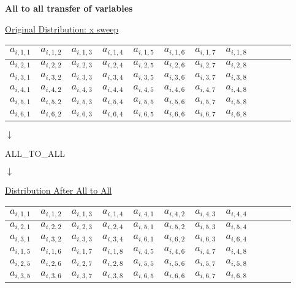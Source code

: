 \documentclass[11pt,doublespace]{article}
\begin{document}
\begin{center}
{\Large {\bf All to all transfer of variables} }
\end{center}
\bigskip

\centerline{\underline{Original Distribution: x sweep}}
\medskip
\begin{center}
\begin{tabular}{|c|c|c|c||c|c|c|c|c|c|c|c|} 
\hline
$ a_{i,1,1}$ &  $a_{i,1,2}$ & $a_{i,1,3}$ & $a_{i,1,4}$ & $a_{i,1,5}$ & $a_{i,1,6}$ & $a_{i,1,7}$ & $a_{i,1,8}$ \\
\hline
$ a_{i,2,1}$ &  $a_{i,2,2}$ & $a_{i,2,3}$ & $a_{i,2,4}$ & $a_{i,2,5}$ & $a_{i,2,6}$ & $a_{i,2,7}$ & $a_{i,2,8}$ \\
\hline
$ a_{i,3,1}$ &  $a_{i,3,2}$ & $a_{i,3,3}$ & $a_{i,3,4}$ & $a_{i,3,5}$ & $a_{i,3,6}$ & $a_{i,3,7}$ & $a_{i,3,8}$ \\
\hline\hline\hline
$ a_{i,4,1}$ &  $a_{i,4,2}$ & $a_{i,4,3}$ & $a_{i,4,4}$ & $a_{i,4,5}$ & $a_{i,4,6}$ & $a_{i,4,7}$ & $a_{i,4,8}$ \\
\hline
$ a_{i,5,1}$ &  $a_{i,5,2}$ & $a_{i,5,3}$ & $a_{i,5,4}$ & $a_{i,5,5}$ & $a_{i,5,6}$ & $a_{i,5,7}$ & $a_{i,5,8}$ \\
\hline
$ a_{i,6,1}$ &  $a_{i,6,2}$ & $a_{i,6,3}$ & $a_{i,6,4}$ & $a_{i,6,5}$ & $a_{i,6,6}$ & $a_{i,6,7}$ & $a_{i,6,8}$ \\
\hline
\end{tabular}
\end{center}

\begin{center}
$\downarrow$
\end{center}

\begin{center}
{\Large ALL\_TO\_ALL }
\end{center}

\begin{center}
$\downarrow$
\end{center}

\centerline{\underline{Distribution After All to All}}
\medskip
\begin{center}
\begin{tabular}{|c|c|c|c||c|c|c|c|c|c|c|c|} 
\hline
$ a_{i,1,1}$ &  $a_{i,1,2}$ & $a_{i,1,3}$ & $a_{i,1,4}$ & $ a_{i,4,1}$ &  $a_{i,4,2}$ & $a_{i,4,3}$ & $a_{i,4,4}$ \\
\hline
$ a_{i,2,1}$ &  $a_{i,2,2}$ & $a_{i,2,3}$ & $a_{i,2,4}$ & $ a_{i,5,1}$ &  $a_{i,5,2}$ & $a_{i,5,3}$ & $a_{i,5,4}$ \\
\hline
$ a_{i,3,1}$ &  $a_{i,3,2}$ & $a_{i,3,3}$ & $a_{i,3,4}$ & $ a_{i,6,1}$ &  $a_{i,6,2}$ & $a_{i,6,3}$ & $a_{i,6,4}$ \\
\hline\hline\hline
$a_{i,1,5}$ & $a_{i,1,6}$ & $a_{i,1,7}$ & $a_{i,1,8}$ & $a_{i,4,5}$ & $a_{i,4,6}$ & $a_{i,4,7}$ & $a_{i,4,8}$ \\
\hline
$a_{i,2,5}$ & $a_{i,2,6}$ & $a_{i,2,7}$ & $a_{i,2,8}$ & $a_{i,5,5}$ & $a_{i,5,6}$ & $a_{i,5,7}$ & $a_{i,5,8}$ \\
\hline
$a_{i,3,5}$ & $a_{i,3,6}$ & $a_{i,3,7}$ & $a_{i,3,8}$ & $a_{i,6,5}$ & $a_{i,6,6}$ & $a_{i,6,7}$ & $a_{i,6,8}$ \\
\hline
\end{tabular}
\end{center}
\end{document}
